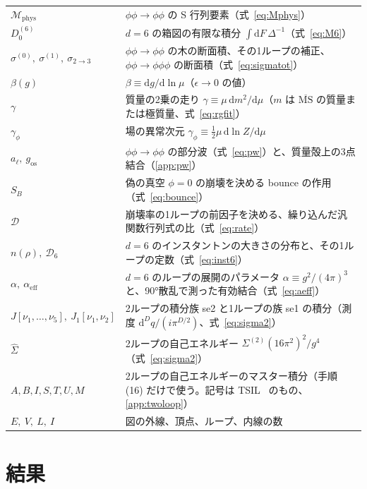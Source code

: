 \documentclass[a4paper,10pt]{ltjsarticle}
\newcommand{\dd}{\mathrm{d}}
\begin{document}
\begin{table}[tbp]
\begin{tabularx}{\linewidth}{>{\raggedright\arraybackslash}p{3.3cm}X}
$\mathcal{M}_{\mathrm{phys}}$ & $\phi\phi\to\phi\phi$ の S 行列要素（式~\eqref{eq:Mphys}） \\
$D_0^{(6)}$ & $d=6$ の箱図の有限な積分 $\int\dd F\,\Delta^{-1}$（式~\eqref{eq:M6}） \\
$\sigma^{(0)},\ \sigma^{(1)},\ \sigma_{2\to3}$ & $\phi\phi\to\phi\phi$ の木の断面積、その1ループの補正、$\phi\phi\to\phi\phi\phi$ の断面積（式~\eqref{eq:sigmatot}） \\
$\beta(g)$ & $\beta\equiv\dd g/\dd\ln\mu$（$\epsilon\to0$ の値） \\
$\gamma$ & 質量の2乗の走り $\gamma\equiv\mu\,\dd m^2/\dd\mu$（$m$ は $\overline{\mathrm{MS}}$ の質量または極質量、式~\eqref{eq:rgfit}） \\
$\gamma_\phi$ & 場の異常次元 $\gamma_\phi\equiv\frac12\mu\,\dd\ln Z/\dd\mu$ \\
$a_\ell,\ g_{\mathrm{os}}$ & $\phi\phi\to\phi\phi$ の部分波（式~\eqref{eq:pw}）と、質量殻上の3点結合（\ref{app:pw}） \\
$S_B$ & 偽の真空 $\phi=0$ の崩壊を決める bounce の作用（式~\eqref{eq:bounce}） \\
$\mathcal D$ & 崩壊率の1ループの前因子を決める、繰り込んだ汎関数行列式の比（式~\eqref{eq:rate}） \\
$n(\rho),\ \mathcal D_6$ & $d=6$ のインスタントンの大きさの分布と、その1ループの定数（式~\eqref{eq:inst6}） \\
$\alpha,\ \alpha_{\mathrm{eff}}$ & $d=6$ のループの展開のパラメータ $\alpha\equiv g^2/(4\pi)^3$ と、90°散乱で測った有効結合（式~\eqref{eq:aeff}） \\
$J[\nu_1,\ldots,\nu_5],\ J_1[\nu_1,\nu_2]$ & 2ループの積分族 se2 と1ループの族 se1 の積分（測度 $\dd^Dq/(i\pi^{D/2})$、式~\eqref{eq:sigma2}） \\
$\hat\Sigma$ & 2ループの自己エネルギー $\Sigma^{(2)}(16\pi^2)^2/g^4$（式~\eqref{eq:sigma2}） \\
$A,B,I,S,T,U,M$ & 2ループの自己エネルギーのマスター積分（手順 (16) だけで使う。記号は TSIL~\cite{tsil} のもの、\ref{app:twoloop}） \\
$E,\ V,\ L,\ I$ & 図の外線、頂点、ループ、内線の数 \\
\bottomrule
\end{tabularx}
\end{table}

\section{結果}\label{sec:results}
\end{document}
